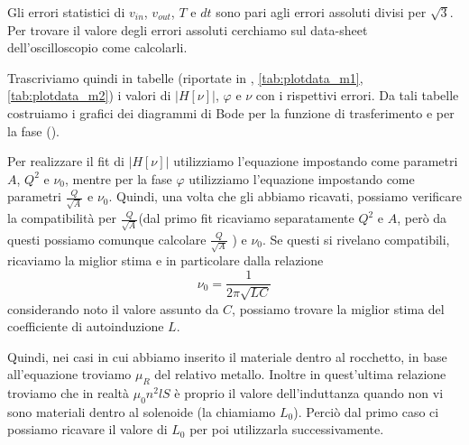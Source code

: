 \documentclass[
    rmp,
    floatfix,
    reprint, 
    superscriptaddress, 
    altaffilletter, 
    amsmath, 
    amssymb, 
    a4paper]{revtex4-2}
\begin{document}
Gli errori statistici di $v_{in}$, $v_{out}$, $T$ e $dt$ sono pari agli errori assoluti divisi per $\sqrt{3}$. Per trovare il valore degli errori assoluti cerchiamo sul data-sheet dell'oscilloscopio come calcolarli.


Trascriviamo quindi in tabelle (riportate in , \ref{tab:plotdata_m1}, \ref{tab:plotdata_m2}) i valori di $\big|H[\nu]\big|$, $\varphi$ e $\nu$ con i rispettivi errori. Da tali tabelle costruiamo i grafici dei diagrammi di Bode per la funzione di trasferimento e per la fase (). 



Per realizzare il fit di $\big|H[\nu]\big|$ utilizziamo l'equazione  impostando come parametri $A$, $Q^2$ e $\nu_{0}$, mentre per la fase $\varphi$ utilizziamo l'equazione  impostando come parametri $\frac{Q}{\sqrt{A}}$ e $\nu_0$. Quindi, una volta che gli abbiamo ricavati, possiamo verificare la compatibilità per $\frac{Q}{\sqrt{A}}$(dal primo fit ricaviamo separatamente $Q^2$ e $A$, però da questi possiamo comunque calcolare $\frac{Q}{\sqrt{A}}$ ) e $\nu_0$. Se questi si rivelano compatibili, ricaviamo la miglior stima e in particolare dalla relazione \[\nu_0=\frac{1}{2\pi\sqrt{LC}}\]  considerando noto il valore assunto da $C$, possiamo trovare la miglior stima del coefficiente di autoinduzione $L$. 

Quindi, nei casi in cui abbiamo inserito il materiale dentro al rocchetto, in base all'equazione  troviamo $\mu_R$ del relativo metallo. Inoltre in quest'ultima relazione troviamo che in realtà $\mu_0 n^2 l S$ è proprio il valore dell'induttanza quando non vi sono materiali dentro al solenoide (la chiamiamo $L_0$). Perciò dal primo caso ci possiamo ricavare il valore di $L_0$ per poi utilizzarla successivamente. 
\end{document}
